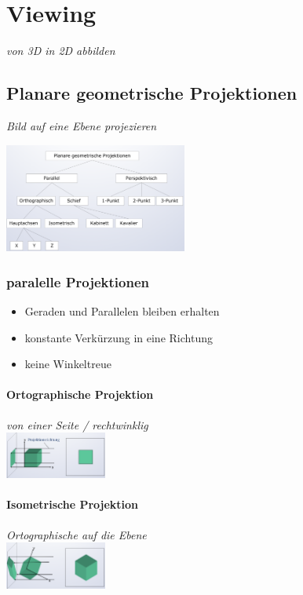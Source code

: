 \section{Viewing}
\textit{von 3D in 2D abbilden}

\subsection{Planare geometrische Projektionen}
\textit{Bild auf eine Ebene projezieren}

\includegraphics[width=0.45\textwidth]{assets/KlassifikationvonProjektionen.png}

\subsubsection{paralelle Projektionen}

\begin{itemize}
	\item Geraden und Parallelen bleiben erhalten
	\item konstante Verkürzung in eine Richtung
	\item keine Winkeltreue
\end{itemize}

\paragraph{Ortographische Projektion}
\textit{von einer Seite / rechtwinklig}\\
\includegraphics[width=0.25\textwidth]{assets/OrtographischeProjektion.png}

\paragraph{Isometrische Projektion}
\textit{Ortographische auf die Ebene}\\
\includegraphics[width=0.25\textwidth]{assets/IsometrischeProjektion.png}
	

